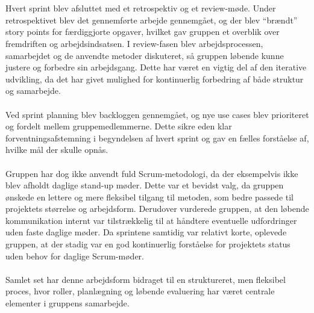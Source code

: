 \\\\
Hvert sprint blev afsluttet med et retrospektiv og et review-møde. Under retrospektivet blev det gennemførte arbejde gennemgået, og der blev “brændt” story points for færdiggjorte opgaver, hvilket gav gruppen et overblik over fremdriften og arbejdsindsatsen. I review-fasen blev arbejdsprocessen, samarbejdet og de anvendte metoder diskuteret, så gruppen løbende kunne justere og forbedre sin arbejdsgang. Dette har været en vigtig del af den iterative udvikling, da det har givet mulighed for kontinuerlig forbedring af både struktur og samarbejde.
\\\\
Ved sprint planning blev backloggen gennemgået, og nye use cases blev prioriteret og fordelt mellem gruppemedlemmerne. Dette sikre eden klar forventningsafstemning i begyndelsen af hvert sprint og gav en fælles forståelse af, hvilke mål der skulle opnås.
\\\\
Gruppen har dog ikke anvendt fuld Scrum-metodologi, da der eksempelvis ikke blev afholdt daglige stand-up møder. Dette var et bevidst valg, da gruppen ønskede en lettere og mere fleksibel tilgang til metoden, som bedre passede til projektets størrelse og arbejdsform. Derudover vurderede gruppen, at den løbende kommunikation internt var tilstrækkelig til at håndtere eventuelle udfordringer uden faste daglige møder. Da sprintene samtidig var relativt korte, oplevede gruppen, at der stadig var en god kontinuerlig forståelse for projektets status uden behov for daglige Scrum-møder.
\\\\
Samlet set har denne arbejdsform bidraget til en struktureret, men fleksibel proces, hvor roller, planlægning og løbende evaluering har været centrale elementer i gruppens samarbejde.
